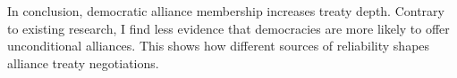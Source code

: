 \documentclass[12pt]{article}
\begin{document}
In conclusion, democratic alliance membership increases treaty depth. 
Contrary to existing research, I find less evidence that democracies are more likely to offer unconditional alliances. 
This shows how different sources of reliability shapes alliance treaty negotiations. 



\singlespace
 
 
\end{document}
